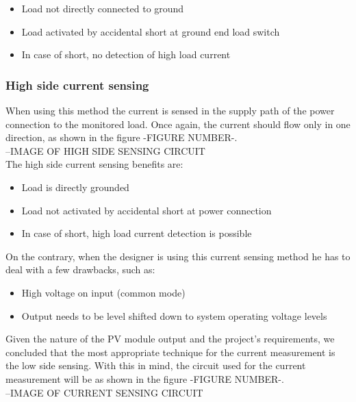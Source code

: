 \begin{itemize}
    \item Load not directly connected to ground
    \item Load activated by accidental short at ground end load switch
    \item In case of short, no detection of high load current
\end{itemize}

\subsubsection{High side current sensing}
When using this method the current is sensed in the supply path of the power connection to the monitored load. Once again, the current should flow only in one direction, as shown in the figure -FIGURE NUMBER-.\\

--IMAGE OF HIGH SIDE SENSING CIRCUIT\\

The high side current sensing benefits are:

\begin{itemize}
    \item Load is directly grounded
    \item Load not activated by accidental short at power connection
    \item In case of short, high load current detection is possible
\end{itemize}

On the contrary, when the designer is using this current sensing method he has to deal with a few drawbacks, such as:

\begin{itemize}
    \item High voltage on input (common mode)
    \item Output needs to be level shifted down to system operating voltage levels
\end{itemize}

Given the nature of the PV module output and the project's requirements, we concluded that the most appropriate technique for the current measurement is the low side sensing. With this in mind, the circuit used for the current measurement will be as shown in the figure -FIGURE NUMBER-.\\

--IMAGE OF CURRENT SENSING CIRCUIT\\

